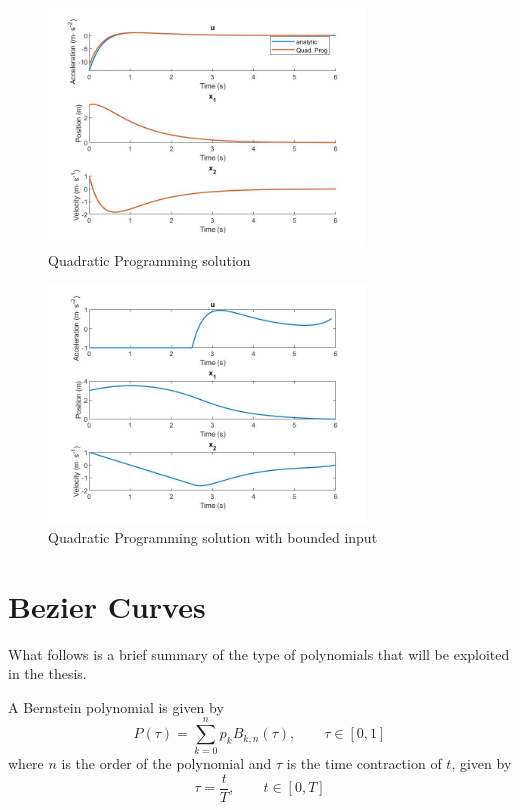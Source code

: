 \begin{figure}[h!]
\centering
\includegraphics[width=0.75\textwidth]{Images/quad_prog_unconstrained.jpg}
\caption{Quadratic Programming solution}
\label{fig:solution_quad_prog_un}
\end{figure}


\begin{figure}[h!]
\centering
\includegraphics[width=0.75\textwidth]{Images/quad_prog_constrained.jpg}
\caption{Quadratic Programming solution with bounded input}
\label{fig:solution_quad_prog_con}
\end{figure}




\section{Bezier Curves}

\par What follows is a brief summary of the type of polynomials that will be exploited in the thesis.

\par A Bernstein polynomial is given by %
\begin{equation}
    \label{eq:bern_pol}
    P(\tau) = \sum_{k=0}^n p_k B_{k,n} (\tau), \qquad \tau\in [0,1]
\end{equation}
where $n$ is the order of the polynomial and $\tau$ is the time contraction of $t$, given by 
\begin{equation}
    \tau = \frac{t}{T}, \qquad t\in [0,T]
    \label{eq:time_delay}
\end{equation}

